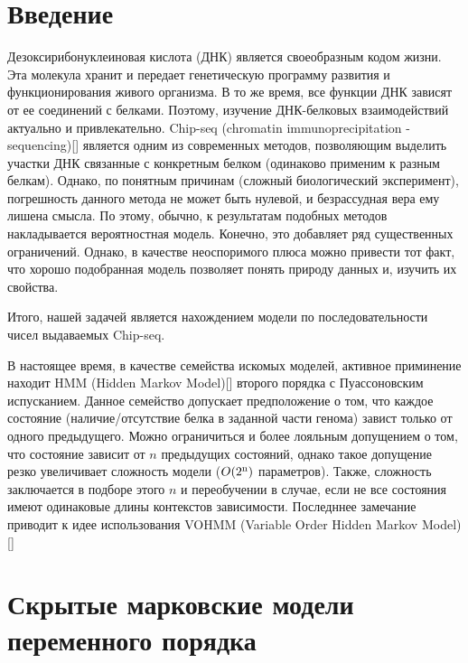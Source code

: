 \documentclass[10pt,a4paper]{article}
\begin{document}
\section{Введение}

Дезоксирибонуклеиновая кислота (ДНК) является своеобразным кодом жизни. Эта молекула хранит и передает генетическую программу развития и функционирования живого организма. 
В то же время, все функции ДНК зависят от ее соединений с белками. 
Поэтому, изучение ДНК-белковых взаимодействий актуально и привлекательно.
Chip-seq (chromatin immunoprecipitation - sequencing)[] является одним из современных методов, позволяющим выделить участки ДНК связанные с конкретным белком (одинаково применим к разным белкам). 
Однако, по понятным причинам (сложный биологический эксперимент), погрешность данного метода не может быть нулевой, и безрассудная вера ему лишена смысла. По этому, обычно, к результатам подобных методов накладывается вероятностная модель. Конечно, это добавляет ряд существенных ограничений. Однако, в качестве неоспоримого плюса можно привести тот факт, что хорошо подобранная модель позволяет понять природу данных и, изучить их свойства.

Итого, нашей задачей является нахождением модели по последовательности чисел выдаваемых Chip-seq. 

В настоящее время, в качестве семейства искомых моделей, активное приминение находит HMM (Hidden Markov Model)[] второго порядка с Пуассоновским испусканием. 
Данное семейство допускает предположение о том, что каждое состояние (наличие/отсутствие белка в заданной части генома) завист только от одного предыдущего.
Можно ограничиться и более лояльным допущением о том, что состояние зависит от $n$ предыдущих состояний, однако такое допущение резко увеличивает сложность модели ($O(2\textsuperscript{n})$ параметров). Также, сложность заключается в подборе этого $n$ и переобучении в случае, если не все состояния имеют одинаковые длины контекстов зависимости.
Последннее замечание приводит к идее использования VOHMM (Variable Order Hidden Markov Model)[]


\section{Скрытые марковские модели переменного порядка}



  
\end{document}
